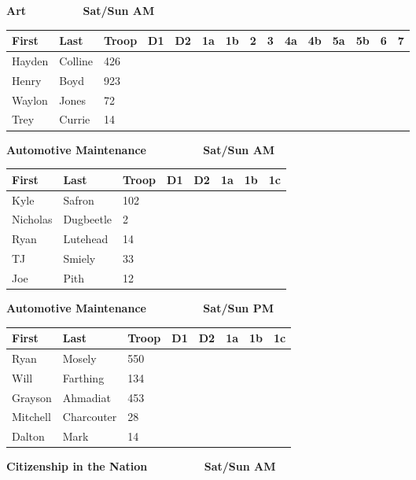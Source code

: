 \documentclass{report}
\begin{document}
{\bf Art~~~~~~~~~Sat/Sun AM}

\vspace{0.5in}
\begin{normalsize}
\begin{tabular}{l|l|l|c|c|c|c|c|c|c|c|c|c|c|c}
First & Last & Troop & D1 & D2&1a&1b&2&3&4a&4b&5a&5b&6&7\\ 

\hline
Hayden & Colline & 426  & &  &  &  &  &  &  &  &  &  &  &  \\ 
 \hline 
Henry & Boyd & 923  & &  &  &  &  &  &  &  &  &  &  &  \\ 
 \hline 
Waylon & Jones & 72  & &  &  &  &  &  &  &  &  &  &  &  \\ 
 \hline 
Trey & Currie & 14  & &  &  &  &  &  &  &  &  &  &  &  \\ 
 \hline 

\end{tabular}
\end{normalsize}
\newpage
{\bf Automotive Maintenance~~~~~~~~~Sat/Sun AM}

\vspace{0.5in}
\begin{normalsize}
\begin{tabular}{l|l|l|c|c|c|c|c}
First & Last & Troop & D1 & D2&1a&1b&1c\\ 

\hline
Kyle & Safron & 102  & &  &  &  &  \\ 
 \hline 
Nicholas & Dugbeetle & 2  & &  &  &  &  \\ 
 \hline 
Ryan & Lutehead & 14  & &  &  &  &  \\ 
 \hline 
TJ & Smiely & 33  & &  &  &  &  \\ 
 \hline 
Joe & Pith & 12  & &  &  &  &  \\ 
 \hline 

\end{tabular}
\end{normalsize}
\newpage
{\bf Automotive Maintenance~~~~~~~~~Sat/Sun PM}

\vspace{0.5in}
\begin{normalsize}
\begin{tabular}{l|l|l|c|c|c|c|c}
First & Last & Troop & D1 & D2&1a&1b&1c\\ 

\hline
Ryan & Mosely & 550  & &  &  &  &  \\ 
 \hline 
Will & Farthing & 134  & &  &  &  &  \\ 
 \hline 
Grayson & Ahmadiat & 453  & &  &  &  &  \\ 
 \hline 
Mitchell & Charcouter & 28  & &  &  &  &  \\ 
 \hline 
Dalton & Mark & 14  & &  &  &  &  \\ 
 \hline 

\end{tabular}
\end{normalsize}
\newpage
{\bf Citizenship in the Nation~~~~~~~~~Sat/Sun AM}
\end{document}
